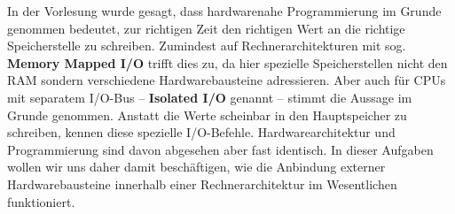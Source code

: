 

In der Vorlesung wurde gesagt, dass hardwarenahe Programmierung im Grunde genommen
bedeutet, zur richtigen Zeit den richtigen Wert an die richtige Speicherstelle zu
schreiben. Zumindest auf Rechnerarchitekturen mit sog. \textbf{Memory Mapped I/O}
trifft dies zu, da hier spezielle Speicherstellen nicht den RAM sondern verschiedene
Hardwarebausteine adressieren. Aber auch für CPUs mit separatem I/O-Bus
-- \textbf{Isolated I/O} genannt -- stimmt die Aussage im Grunde genommen. Anstatt
die Werte scheinbar in den Hauptspeicher zu schreiben, kennen diese spezielle
I/O-Befehle. Hardwarearchitektur und Programmierung sind davon abgesehen aber
fast identisch. In dieser Aufgaben wollen wir uns daher damit beschäftigen, wie
die Anbindung externer Hardwarebausteine innerhalb einer Rechnerarchitektur im
Wesentlichen funktioniert.

